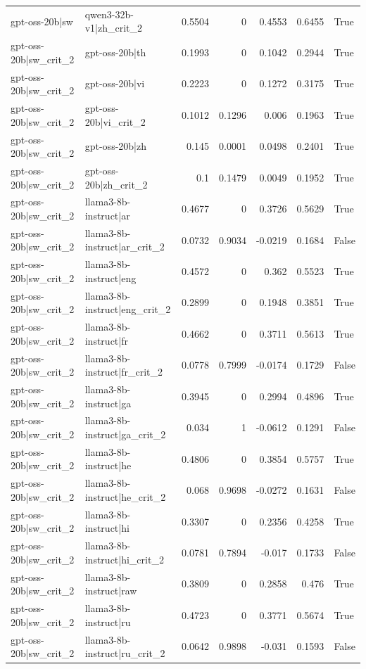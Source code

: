 \begin{table}
\begin{tabular}{l l r r r r l}
gpt-oss-20b|sw & qwen3-32b-v1|zh_crit_2 & 0.5504 & 0 & 0.4553 & 0.6455 & True \\
gpt-oss-20b|sw_crit_2 & gpt-oss-20b|th & 0.1993 & 0 & 0.1042 & 0.2944 & True \\
gpt-oss-20b|sw_crit_2 & gpt-oss-20b|vi & 0.2223 & 0 & 0.1272 & 0.3175 & True \\
gpt-oss-20b|sw_crit_2 & gpt-oss-20b|vi_crit_2 & 0.1012 & 0.1296 & 0.006 & 0.1963 & True \\
gpt-oss-20b|sw_crit_2 & gpt-oss-20b|zh & 0.145 & 0.0001 & 0.0498 & 0.2401 & True \\
gpt-oss-20b|sw_crit_2 & gpt-oss-20b|zh_crit_2 & 0.1 & 0.1479 & 0.0049 & 0.1952 & True \\
gpt-oss-20b|sw_crit_2 & llama3-8b-instruct|ar & 0.4677 & 0 & 0.3726 & 0.5629 & True \\
gpt-oss-20b|sw_crit_2 & llama3-8b-instruct|ar_crit_2 & 0.0732 & 0.9034 & -0.0219 & 0.1684 & False \\
gpt-oss-20b|sw_crit_2 & llama3-8b-instruct|eng & 0.4572 & 0 & 0.362 & 0.5523 & True \\
gpt-oss-20b|sw_crit_2 & llama3-8b-instruct|eng_crit_2 & 0.2899 & 0 & 0.1948 & 0.3851 & True \\
gpt-oss-20b|sw_crit_2 & llama3-8b-instruct|fr & 0.4662 & 0 & 0.3711 & 0.5613 & True \\
gpt-oss-20b|sw_crit_2 & llama3-8b-instruct|fr_crit_2 & 0.0778 & 0.7999 & -0.0174 & 0.1729 & False \\
gpt-oss-20b|sw_crit_2 & llama3-8b-instruct|ga & 0.3945 & 0 & 0.2994 & 0.4896 & True \\
gpt-oss-20b|sw_crit_2 & llama3-8b-instruct|ga_crit_2 & 0.034 & 1 & -0.0612 & 0.1291 & False \\
gpt-oss-20b|sw_crit_2 & llama3-8b-instruct|he & 0.4806 & 0 & 0.3854 & 0.5757 & True \\
gpt-oss-20b|sw_crit_2 & llama3-8b-instruct|he_crit_2 & 0.068 & 0.9698 & -0.0272 & 0.1631 & False \\
gpt-oss-20b|sw_crit_2 & llama3-8b-instruct|hi & 0.3307 & 0 & 0.2356 & 0.4258 & True \\
gpt-oss-20b|sw_crit_2 & llama3-8b-instruct|hi_crit_2 & 0.0781 & 0.7894 & -0.017 & 0.1733 & False \\
gpt-oss-20b|sw_crit_2 & llama3-8b-instruct|raw & 0.3809 & 0 & 0.2858 & 0.476 & True \\
gpt-oss-20b|sw_crit_2 & llama3-8b-instruct|ru & 0.4723 & 0 & 0.3771 & 0.5674 & True \\
gpt-oss-20b|sw_crit_2 & llama3-8b-instruct|ru_crit_2 & 0.0642 & 0.9898 & -0.031 & 0.1593 & False \\

\end{tabular}
\end{table}
